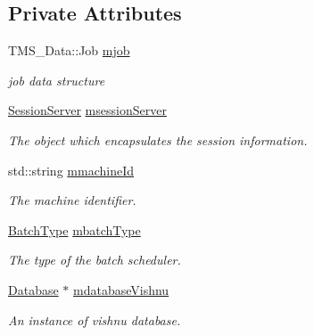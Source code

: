 \subsection*{Private Attributes}
\begin{DoxyCompactItemize}
\item 
\hypertarget{classJobServer_a323af131d079442a3e54f01386973576}{
TMS\_\-Data::Job \hyperlink{classJobServer_a323af131d079442a3e54f01386973576}{mjob}}
\label{classJobServer_a323af131d079442a3e54f01386973576}

\begin{DoxyCompactList}\small\item\em job data structure \item\end{DoxyCompactList}\item 
\hypertarget{classJobServer_a72e6f65b8f124b927d47b3d31f7f4049}{
\hyperlink{classSessionServer}{SessionServer} \hyperlink{classJobServer_a72e6f65b8f124b927d47b3d31f7f4049}{msessionServer}}
\label{classJobServer_a72e6f65b8f124b927d47b3d31f7f4049}

\begin{DoxyCompactList}\small\item\em The object which encapsulates the session information. \item\end{DoxyCompactList}\item 
\hypertarget{classJobServer_ad9c1fc25152bb646b083e3e2b13df170}{
std::string \hyperlink{classJobServer_ad9c1fc25152bb646b083e3e2b13df170}{mmachineId}}
\label{classJobServer_ad9c1fc25152bb646b083e3e2b13df170}

\begin{DoxyCompactList}\small\item\em The machine identifier. \item\end{DoxyCompactList}\item 
\hypertarget{classJobServer_a98f94235e0110ae5bf3bb8dee3f45c0f}{
\hyperlink{utilVishnu_8hpp_a864d748e7097d176552dd4c7635016ea}{BatchType} \hyperlink{classJobServer_a98f94235e0110ae5bf3bb8dee3f45c0f}{mbatchType}}
\label{classJobServer_a98f94235e0110ae5bf3bb8dee3f45c0f}

\begin{DoxyCompactList}\small\item\em The type of the batch scheduler. \item\end{DoxyCompactList}\item 
\hypertarget{classJobServer_a293eaa4e6fe549b2445aa55121b633d5}{
\hyperlink{classDatabase}{Database} $\ast$ \hyperlink{classJobServer_a293eaa4e6fe549b2445aa55121b633d5}{mdatabaseVishnu}}
\label{classJobServer_a293eaa4e6fe549b2445aa55121b633d5}

\begin{DoxyCompactList}\small\item\em An instance of vishnu database. \item\end{DoxyCompactList}\end{DoxyCompactItemize}


